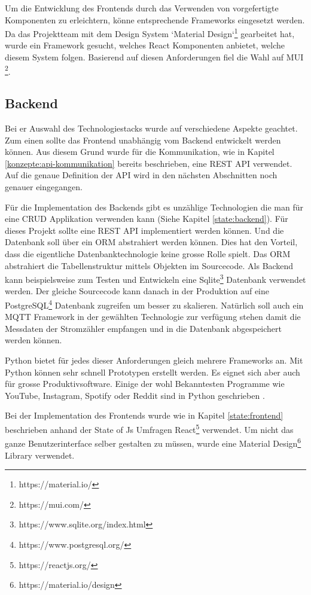Um die Entwicklung des Frontends durch das Verwenden von vorgefertigte Komponenten zu erleichtern, könne entsprechende Frameworks eingesetzt werden.
Da das Projektteam mit dem Design System `Material Design`\footnote{https://material.io/} gearbeitet hat,
wurde ein Framework gesucht, welches React Komponenten anbietet, welche diesem System folgen.
Basierend auf diesen Anforderungen fiel die Wahl auf MUI \footnote{https://mui.com/}.


\subsection{Backend}
Bei er Auswahl des Technologiestacks wurde auf verschiedene Aspekte geachtet.
Zum einen sollte das Frontend unabhängig vom Backend entwickelt werden können.
Aus diesem Grund wurde für die Kommunikation, wie in Kapitel \ref{konzepte:api-kommunikation}
bereits beschrieben, eine \ac{REST} \ac{API} verwendet.
Auf die genaue Definition der \ac{API} wird in den nächsten Abschnitten noch genauer eingegangen.

Für die Implementation des Backends gibt es unzählige Technologien die man für eine \ac{CRUD}
Applikation verwenden kann (Siehe Kapitel \ref{state:backend}). Für dieses Projekt sollte
eine \ac{REST} \ac{API} implementiert werden können. Und die Datenbank soll über ein \ac{ORM}
abstrahiert werden können. Dies hat den Vorteil, dass die eigentliche Datenbanktechnologie
keine grosse Rolle spielt. Das \ac{ORM} abstrahiert die Tabellenstruktur mittels
Objekten im Sourcecode. Als Backend kann beispielsweise zum Testen und Entwickeln
eine Sqlite\footnote{https://www.sqlite.org/index.html} Datenbank verwendet werden.
Der gleiche Sourcecode kann danach in der Produktion auf eine PostgreSQL\footnote{https://www.postgresql.org/}
Datenbank zugreifen um besser zu skalieren.
Natürlich soll auch ein \ac{MQTT} Framework in der gewählten Technologie zur verfügung stehen
damit die Messdaten der Stromzähler empfangen und in die Datenbank abgespeichert werden können.

Python bietet für jedes dieser Anforderungen gleich mehrere Frameworks an. Mit Python können sehr
schnell Prototypen erstellt werden. Es eignet sich aber auch für grosse Produktivsoftware.
Einige der wohl Bekanntesten Programme wie YouTube, Instagram, Spotify oder Reddit sind
in Python geschrieben \parencite{popular_python_sw}.

Bei der Implementation des Frontends wurde wie in Kapitel \ref{state:frontend} beschrieben
anhand der State of Js Umfragen React\footnote{https://reactjs.org/} verwendet.
Um nicht das ganze Benutzerinterface selber gestalten zu müssen, wurde eine Material Design\footnote{https://material.io/design}
Library verwendet.

